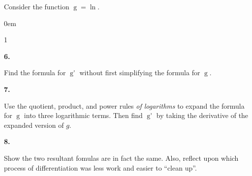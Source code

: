 \documentclass[12pt,]{book}
\theoremstyle{plain}
\theoremstyle{definition}
\numberwithin{equation}{section}
\newenvironment{exercisegroup}%
{\medskip\noindent}%
{\par\bigskip}%
\newlength{\exercisegroupindent}%
\newlength{\exercisegroupitemwidth}%
\newenvironment{exercisegrouplist}%
{\vspace{-\partopsep}%
\begin{adjustwidth}{\exercisegroupindent}{0em}}%
{\end{adjustwidth}%
\vspace{-\partopsep}%
\vspace{\baselineskip}}%
\newenvironment{exercisegroupbycol}[1]%
{\begin{exercisegrouplist}%
\vspace{-\multicolsep}%
\begin{multicols}{#1}%
\setlength{\parindent}{0em}%
\setlength{\exercisegroupitemwidth}{\linewidth}}%
{\end{multicols}%
\vspace{-\multicolsep}%
\end{exercisegrouplist}}%
\newenvironment{exercisegroupitem}[1]%
{\begin{minipage}[t]{\exercisegroupitemwidth}
\vspace{0pt}%
{\bfseries#1}%
\rule{0pt}{\baselineskip}}{\strut%
\end{minipage}%
\hspace{\columnsep}}%
\providecommand\phantomsection{}
\newcommand{\fe}[2]{\mathop{{#1}{\left(#2\right)}}}
\newcommand{\fd}[1]{#1'}
\begin{document}
\begin{exercisegroup}%
Consider the function \(\fe{g}{t}=\fe{\ln}{\frac{5}{t^3\fe{\sec}{t}}}\).%
\begin{exercisegroupbycol}{1}%
\begin{exercisegroupitem}{6. }\phantomsection\hypertarget{exercise-305}{\null}
Find the formula for \(\fe{\fd{g}}{t}\) without first simplifying the formula for \(\fe{g}{t}\).%
\end{exercisegroupitem}%
\par%
\begin{exercisegroupitem}{7. }\phantomsection\hypertarget{exercise-306}{\null}
Use the quotient, product, and power rules \emph{of logarithms} to expand the formula for \(\fe{g}{t}\) into three logarithmic terms.  Then find \(\fe{\fd{g}}{t}\) by taking the derivative of the expanded version of \(g\). %
\end{exercisegroupitem}%
\par%
\begin{exercisegroupitem}{8. }\phantomsection\hypertarget{exercise-307}{\null}
Show the two resultant fomulas are in fact the same. Also, reflect upon which process of differentiation was less work and easier to ``clean up''.%
\end{exercisegroupitem}%
\par%
\end{exercisegroupbycol}%
\end{exercisegroup}%
\typeout{************************************************}
\typeout{************************************************}
\end{document}
